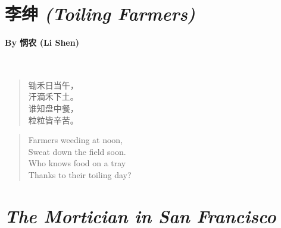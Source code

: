 
\newpage
\section*{{李绅} \emph{(Toiling Farmers)}}
\paragraph{By {悯农} (Li Shen)}~

{
\begin{verse}
	锄禾日当午，\\
	汗滴禾下土。\\
	谁知盘中餐，\\
	粒粒皆辛苦。
\end{verse}
}

\vspace{2em}
\begin{verse}
	Farmers weeding at noon,\\
	Sweat down the field soon.\\
	Who knows food on a tray\\
	Thanks to their toiling day?
\end{verse}

\newpage
{}
\section*{\emph{The Mortician in San Francisco}}
